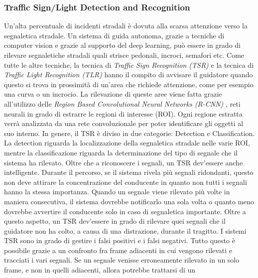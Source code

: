 \subsubsection{Traffic Sign/Light Detection and Recognition}
Un'alta percentuale di incidenti stradali è dovuta alla scarsa attenzione verso 
la segnaletica stradale. Un sistema di guida autonoma, grazie a tecniche di 
computer vision e grazie al supporto del deep learning, può essere in grado 
di rilevare segnaletiche stradali quali strisce pedonali, incroci, semafori etc. 
Come tutte le altre tecniche, la tecnica di \emph{Traffic Sign Recognition (TSR)} e 
la tecnica di \emph{Traffic Light Recognition (TLR)} hanno il compito di avvisare 
il guidatore quando questo si trova in prossimità di un'area che richiede 
attenzione, come per esempio una curva o un incrocio. La rilevazione di 
queste aree viene fatta grazie all'utilizzo delle \emph{Region Based Convolutional 
Neural Networks (R-CNN)} \cite{RCNN-TLR}, reti neurali in grado di estrarre le regioni 
di interesse (ROI). Ogni regione estratta verrà analizzata da una rete 
convoluzionale per poter identificare gli oggetti al suo interno. In genere, 
il TSR è diviso in due categorie: Detection e Classification. La detection 
riguarda la localizzazione della segnaletica stradale nelle varie ROI, mentre la 
classificazione riguarda la determinazione del tipo di segnale che il sistema 
ha rilevato. Oltre che a riconoscere i segnali, un TSR dev'essere anche 
intelligente. Durante il percorso, se il sistema rivela più segnali ridondanti, 
questo non deve attirare la concentrazione del conducente in quanto non tutti 
i segnali hanno la stessa importanza. Quando un segnale viene rilevato più 
volte in maniera consecutiva, il sistema dovrebbe notificarlo una sola volta 
o quanto meno dovrebbe avvertire il conducente solo in caso di segnaletica importante. 
Oltre a questo aspetto, un TSR dev'essere in grado di rilevare quei segnali 
che il guidatore non ha colto, a causa di una distrazione, durante il tragitto. 
I sistemi TSR sono in grado di gestire i falsi positivi e i falsi negativi. Tutto 
questo è possibile grazie a un confronto fra frame adiacenti in cui vengono 
rilevati e tracciati i vari segnali. Se un segnale venisse erroneamente rilevato 
in un solo frame, e non in quelli adiacenti, allora potrebbe trattarsi di un 
